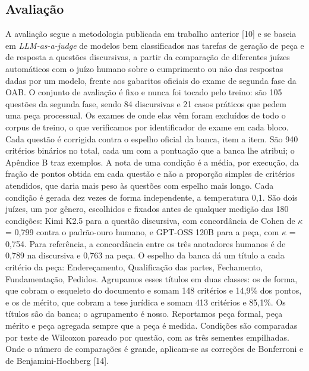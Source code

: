 \documentclass{IOS-Book-Article}
\begin{document}
\subsection{Avaliação}
A avaliação segue a metodologia publicada em trabalho anterior [10] e se baseia em \emph{LLM-as-a-judge} de modelos bem classificados nas tarefas de geração de peça e de resposta a questões discursivas, a partir da comparação de diferentes juízes automáticos com o juízo humano sobre o cumprimento ou não das respostas dadas por um modelo, frente aos gabaritos oficiais do exame de segunda fase da OAB.
O conjunto de avaliação é fixo e nunca foi tocado pelo treino: são 105 questões da segunda fase, sendo 84 discursivas e 21 casos práticos que pedem uma peça processual. Os exames de onde elas vêm foram excluídos de todo o corpus de treino, o que verificamos por identificador de exame em cada bloco.
Cada questão é corrigida contra o espelho oficial da banca, item a item. São 940 critérios binários no total, cada um com a pontuação que a banca lhe atribui; o Apêndice B traz exemplos. A nota de uma condição é a média, por execução, da fração de pontos obtida em cada questão e não a proporção simples de critérios atendidos, que daria mais peso às questões com espelho mais longo. Cada condição é gerada dez vezes de forma independente, a temperatura 0,1.
São dois juízes, um por gênero, escolhidos e fixados antes de qualquer medição das 180 condições: Kimi K2.5 para a questão discursiva, com concordância de Cohen de $\kappa$ = 0,799 contra o padrão-ouro humano, e GPT-OSS 120B para a peça, com $\kappa$ = 0,754. Para referência, a concordância entre os três anotadores humanos é de 0,789 na discursiva e 0,763 na peça.
O espelho da banca dá um título a cada critério da peça: Endereçamento, Qualificação das partes, Fechamento, Fundamentação, Pedidos. Agrupamos esses títulos em duas classes: os de forma, que cobram o esqueleto do documento e somam 148 critérios e 14,9\% dos pontos, e os de mérito, que cobram a tese jurídica e somam 413 critérios e 85,1\%. Os títulos são da banca; o agrupamento é nosso. Reportamos peça formal, peça mérito e peça agregada sempre que a peça é medida.
Condições são comparadas por teste de Wilcoxon pareado por questão, com as três sementes empilhadas. Onde o número de comparações é grande, aplicam-se as correções de Bonferroni e de Benjamini-Hochberg [14].
\end{document}
